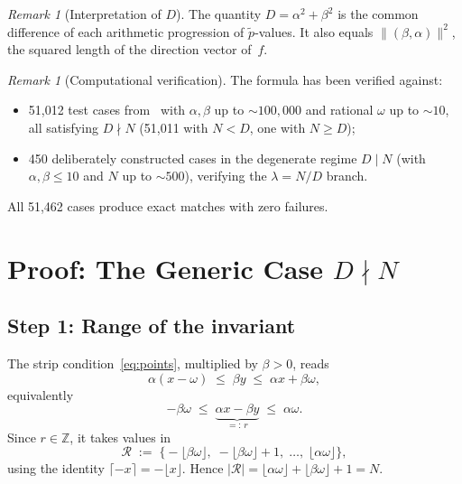 \documentclass[11pt]{article}
\theoremstyle{plain}
\theoremstyle{definition}
\theoremstyle{remark}
\newtheorem{remark}[theorem]{Remark}
\begin{document}
\begin{remark}[Interpretation of $D$]\label{rem:D}
The quantity $D = \alpha^2+\beta^2$ is the common difference of each
arithmetic progression of $\tilde{p}$-values.
It also equals $\lVert(\beta,\alpha)\rVert^2$, the squared length of the
direction vector of~$f$.
\end{remark}

\begin{remark}[Computational verification]\label{rem:verification}
The formula has been verified against:
\begin{itemize}
    \item 51{,}012 test cases from~\cite{Kunert2025} with
          $\alpha, \beta$ up to ${\sim}100{,}000$ and rational $\omega$
          up to ${\sim}10$, all satisfying $D \nmid N$
          (51{,}011 with $N < D$, one with $N \ge D$);
    \item 450 deliberately constructed cases in the degenerate regime
          $D \mid N$ (with $\alpha, \beta \le 10$ and $N$ up to
          ${\sim}500$), verifying the $\lambda = N/D$ branch.
\end{itemize}
All 51{,}462 cases produce exact matches with zero failures.
\end{remark}

\section{Proof: The Generic Case $D \nmid N$}\label{sec:proof}

\subsection{Step 1: Range of the invariant}\label{subsec:step1}

The strip condition~\eqref{eq:points}, multiplied by $\beta > 0$, reads
\[
    \alpha(x - \omega) \;\le\; \beta y \;\le\; \alpha x + \beta\omega,
\]
equivalently
\begin{equation}\label{eq:r_range}
    -\beta\omega \;\le\;
    \underbrace{\alpha x - \beta y}_{=:\,r}
    \;\le\; \alpha\omega.
\end{equation}
Since $r \in \mathbb{Z}$, it takes values in
\begin{equation}\label{eq:R}
    \mathcal{R} \;:=\;
    \bigl\{-\lfloor\beta\omega\rfloor,\;
    -\lfloor\beta\omega\rfloor + 1,\; \ldots,\;
    \lfloor\alpha\omega\rfloor\bigr\},
\end{equation}
using the identity $\lceil{-x}\rceil = -\lfloor x \rfloor$.
Hence $|\mathcal{R}| = \lfloor\alpha\omega\rfloor + \lfloor\beta\omega\rfloor
+ 1 = N$.
\end{document}
